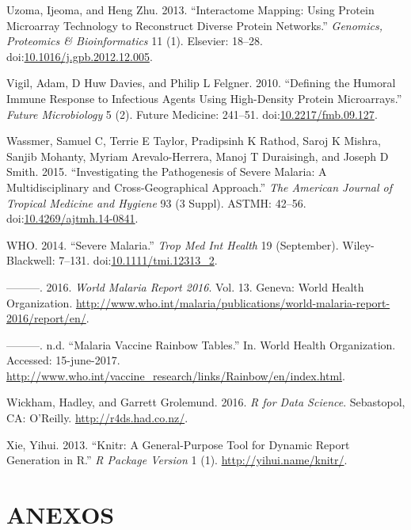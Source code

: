 \documentclass[a4paper]{article}
\begin{document}
\hypertarget{ref-uzoma2013interactome}{}
Uzoma, Ijeoma, and Heng Zhu. 2013. ``Interactome Mapping: Using Protein
Microarray Technology to Reconstruct Diverse Protein Networks.''
\emph{Genomics, Proteomics \& Bioinformatics} 11 (1). Elsevier: 18--28.
doi:\href{https://doi.org/10.1016/j.gpb.2012.12.005}{10.1016/j.gpb.2012.12.005}.

\hypertarget{ref-vigil2010}{}
Vigil, Adam, D Huw Davies, and Philip L Felgner. 2010. ``Defining the
Humoral Immune Response to Infectious Agents Using High-Density Protein
Microarrays.'' \emph{Future Microbiology} 5 (2). Future Medicine:
241--51.
doi:\href{https://doi.org/10.2217/fmb.09.127}{10.2217/fmb.09.127}.

\hypertarget{ref-wassmer2015}{}
Wassmer, Samuel C, Terrie E Taylor, Pradipsinh K Rathod, Saroj K Mishra,
Sanjib Mohanty, Myriam Arevalo-Herrera, Manoj T Duraisingh, and Joseph D
Smith. 2015. ``Investigating the Pathogenesis of Severe Malaria: A
Multidisciplinary and Cross-Geographical Approach.'' \emph{The American
Journal of Tropical Medicine and Hygiene} 93 (3 Suppl). ASTMH: 42--56.
doi:\href{https://doi.org/10.4269/ajtmh.14-0841}{10.4269/ajtmh.14-0841}.

\hypertarget{ref-WHO2014severe}{}
WHO. 2014. ``Severe Malaria.'' \emph{Trop Med Int Health} 19
(September). Wiley-Blackwell: 7--131.
doi:\href{https://doi.org/10.1111/tmi.12313_2}{10.1111/tmi.12313\_2}.

\hypertarget{ref-WHO2016world}{}
---------. 2016. \emph{World Malaria Report 2016}. Vol. 13. Geneva:
World Health Organization.
\url{http://www.who.int/malaria/publications/world-malaria-report-2016/report/en/}.

\hypertarget{ref-rainbow2016}{}
---------. n.d. ``Malaria Vaccine Rainbow Tables.'' In. World Health
Organization. Accessed: 15-june-2017.
\url{http://www.who.int/vaccine_research/links/Rainbow/en/index.html}.

\hypertarget{ref-wickham2016r4ds}{}
Wickham, Hadley, and Garrett Grolemund. 2016. \emph{R for Data Science}.
Sebastopol, CA: O'Reilly. \url{http://r4ds.had.co.nz/}.

\hypertarget{ref-knitr}{}
Xie, Yihui. 2013. ``Knitr: A General-Purpose Tool for Dynamic Report
Generation in R.'' \emph{R Package Version} 1 (1).
\url{http://yihui.name/knitr/}.

\section{ANEXOS}\label{anexos}
\end{document}
